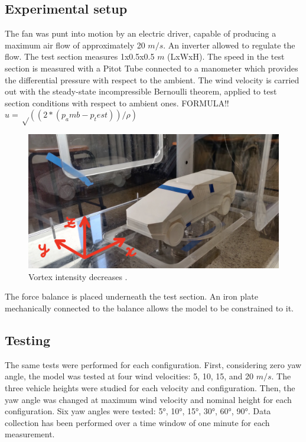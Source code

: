 \documentclass{elbioimp2}
\begin{document}
\subsection{Experimental setup}
 The fan was punt into motion by an electric driver, capable of producing a maximum air flow of approximately 20 $m/s$. An inverter allowed to regulate the flow.
 The test section measures 1x0.5x0.5 $m$ (LxWxH).
The speed in the test section is measured with a Pitot Tube connected to a manometer which provides the differential pressure with respect to the ambient. The wind velocity is carried out with the steady-state incompressible Bernoulli theorem, applied to test section conditions with respect to ambient ones.
FORMULA!!
$u=√((2*(p_amb-p_test))/ρ)$
    \begin{figure}[htp]
      \centering
      \includegraphics[width=0.9\columnwidth]{windtunnel.jpg}
      \caption{Vortex intensity decreases .\label{windtunnel}}
    \end{figure}
 The force balance is placed underneath the test section. An iron plate mechanically connected to the balance allows the model to be constrained to it. 
\subsection{Testing}
The same tests were performed for each configuration. First, considering zero yaw angle, the model was tested at four wind velocities: 5, 10, 15, and 20 $m/s$. The three vehicle heights were studied for each velocity and configuration. 
Then, the yaw angle was changed at maximum wind velocity and nominal height for each configuration. Six yaw angles were tested: 5°, 10°, 15°, 30°, 60°, 90°. 
Data collection has been performed over a time window of one minute for each measurement.
\end{document}
